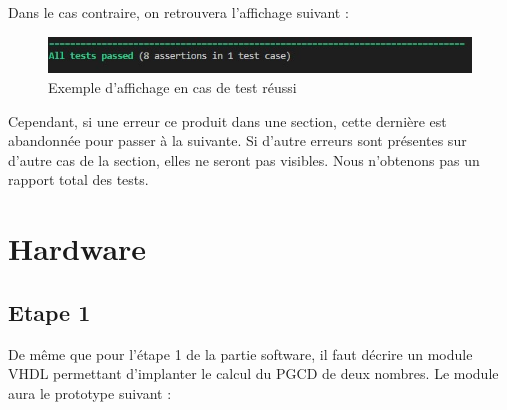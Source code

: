 \documentclass[a4paper]{article}
\begin{document}
        Dans le cas contraire, on retrouvera l'affichage suivant :
        \begin{figure}[H]
            \centering
            \includegraphics[scale=0.6]{Pictures/test_passed.jpg}
            \caption{Exemple d'affichage en cas de test réussi}
            \label{fig:Test_success}
        \end{figure}

        Cependant, si une erreur ce produit dans une section, cette dernière est abandonnée pour passer à la suivante.
        Si d'autre erreurs sont présentes sur d'autre cas de la section, elles ne seront pas visibles. Nous n'obtenons pas un rapport total des tests.

\section{Hardware}
    \subsection{Etape 1}
        De même que pour l'étape 1 de la partie software, il faut décrire un module VHDL permettant d'implanter le calcul du PGCD de deux nombres.
        Le module aura le prototype suivant :
\end{document}
